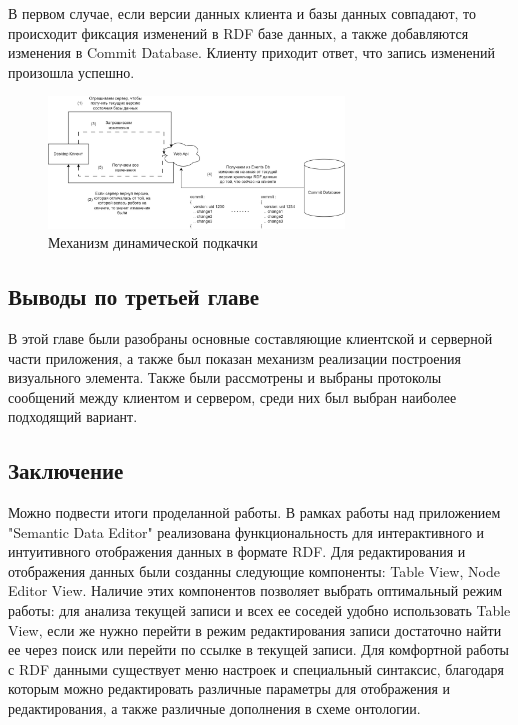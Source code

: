 \documentclass[12pt]{article}
\newcommand{\anonsection}[1]{\section*{#1}\addcontentsline{toc}{section}{#1}}
\begin{document}
В первом случае, если версии данных клиента и базы данных совпадают, то происходит фиксация изменений в RDF базе данных, а также добавляются изменения в Commit Database. Клиенту приходит ответ, что запись изменений произошла успешно.

\begin{figure}[!ht]
    \centering
    \includegraphics[width=0.7\textwidth]{_images/if_merge_failure.png}
    \caption{Механизм динамической подкачки}
    \label{fig:if_merge_failure}
\end{figure}

\subsection{Выводы по третьей главе}
\qquad В этой главе были разобраны основные составляющие клиентской и серверной части приложения, а также был показан механизм реализации построения визуального элемента. Также были рассмотрены и выбраны протоколы сообщений между клиентом и сервером, среди них был выбран наиболее подходящий вариант.
\pagebreak

\sectionfont{\centering}
\begin{center}
    {\anonsection{Заключение}}
\end{center}

Можно подвести итоги проделанной работы. В рамках работы над приложением "Semantic Data Editor" реализована функциональность для интерактивного и интуитивного отображения данных в формате RDF. Для редактирования и отображения данных были созданны следующие компоненты: Table View, Node Editor View. Наличие этих компонентов позволяет выбрать оптимальный режим работы: для анализа текущей записи и всех ее соседей удобно использовать Table View, если же нужно перейти в режим редактирования записи достаточно найти ее через поиск или перейти по ссылке в текущей записи. Для комфортной работы с RDF данными существует меню настроек и специальный синтаксис, благодаря которым можно редактировать различные параметры для отображения и редактирования, а также различные дополнения в схеме онтологии.\par
\end{document}
